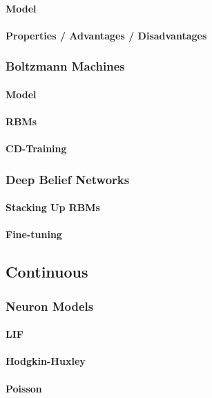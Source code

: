 \paragraph{Model}
\paragraph{Properties / Advantages / Disadvantages}
\subsubsection{Boltzmann Machines}
\paragraph{Model}
\paragraph{RBMs}
\paragraph{CD-Training}
\subsubsection{Deep Belief Networks}
\paragraph{Stacking Up RBMs}
\paragraph{Fine-tuning}

\subsection{Continuous}
\subsubsection{Neuron Models}
\paragraph{LIF}
\paragraph{Hodgkin-Huxley}
\paragraph{Poisson}
